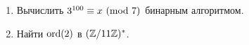 \documentclass{ca-sheet}
\begin{document}

\begin{enumerate}
  \item Вычислить $3^{100} \equiv x\ (\mathrm{mod}\ 7)$ бинарным алгоритмом.
  \item Найти $\operatorname{ord}(2)$ в $(\mathbb{Z}/11\mathbb{Z})^{*}$.
\end{enumerate}
\end{document}
